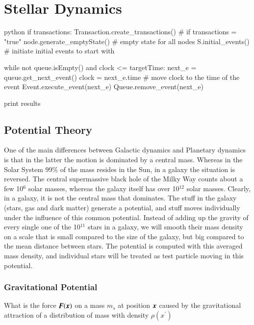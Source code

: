 \chapter{Stellar Dynamics}


\begin{mintedbox}{python}
if transactions: Transaction.create_transactions() # if transactions = "true"
node.generate_emptyState() # empty state for all nodes
S.initial_events() # initiate initial events to start with

while not queue.isEmpty() and clock <= targetTime:
      next_e = queue.get_next_event()
      clock = next_e.time # move clock to the time of the event
      Event.execute_event(next_e)
      Queue.remove_event(next_e)

print results
\end{mintedbox}

\section{Potential Theory}

One of the main differences between Galactic dynamics and Planetary dynamics is that in the latter the motion is dominated by a central mass. Whereas in the Solar System 99\% of the mass resides in the Sun, in a galaxy the situation is reversed. The central supermassive black hole of the Milky Way counts about a few 10$^6$ solar masses, whereas the galaxy itself has over 10$^{12}$ solar masses. Clearly, in a galaxy, it is not the central mass that dominates. The stuff in the galaxy (stars, gas and dark matter) generate a potential, and stuff moves individually under the influence of this common potential. Instead of adding up the gravity of every single one of the 10$^{11}$ stars in a galaxy, we will smooth their mass density on a scale that is small compared to the size of the galaxy, but big compared to the mean distance between stars. The potential is computed with this averaged mass density, and individual stars will be treated as test particle moving in this potential.

\subsection{Gravitational Potential}

What is the force ${\boldsymbol{F}}({\boldsymbol{x}})$ on a mass $m_s$ at position ${\boldsymbol{x}}$ caused by the gravitational attraction of a distribution of mass with density $\rho(x^\prime) $

